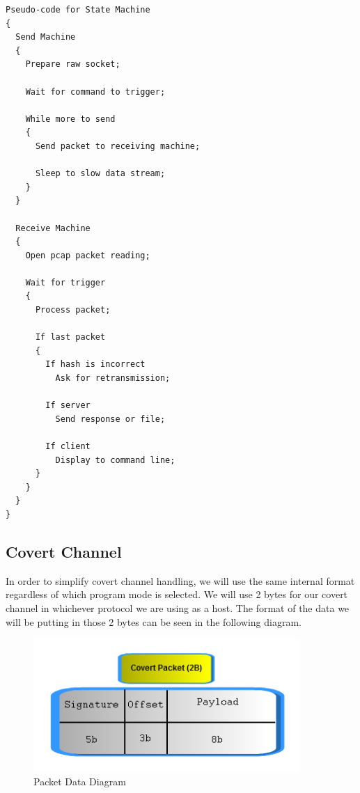 \documentclass[titlepage]{article}
\begin{document}
\begin{lstlisting}
Pseudo-code for State Machine
{
  Send Machine
  {
    Prepare raw socket;
    
    Wait for command to trigger;
    
    While more to send
    {
      Send packet to receiving machine;
       
      Sleep to slow data stream;
    }
  }
  
  Receive Machine
  {
    Open pcap packet reading;
    
    Wait for trigger
    {
      Process packet;
      
      If last packet
      {
        If hash is incorrect
          Ask for retransmission;
        
        If server
          Send response or file;
      
        If client
          Display to command line;
      }
    }
  }
}
\end{lstlisting}

\clearpage

\subsection{Covert Channel}

In order to simplify covert channel handling, we will use the same internal format regardless of which program mode is selected. We will use 2 bytes for our covert channel
in whichever protocol we are using as a host. The format of the data we will be putting in those 2 bytes can be seen in the following diagram.

\begin{figure}[htb]                                                                       
  \begin{center}
    \includegraphics[width=0.9\textwidth]{imgs/packet.png}
  \end{center}
  \caption{Packet Data Diagram}
  \label{fig:packet}
\end{figure}
\end{document}
